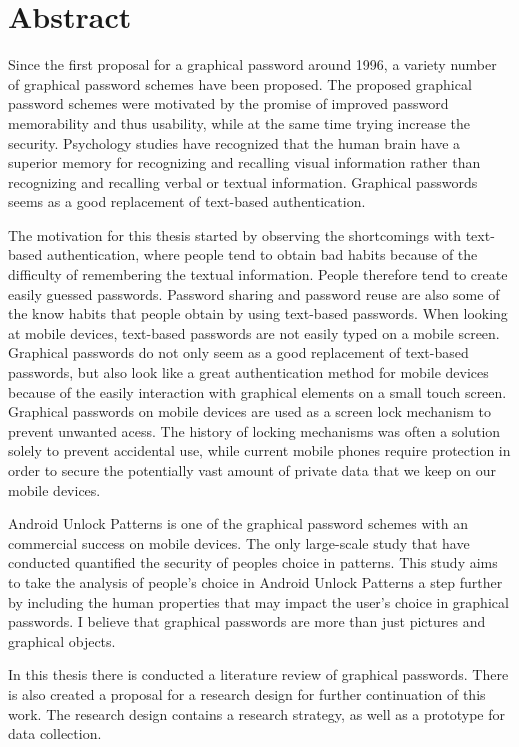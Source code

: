 \section*{Abstract}
  
  Since the first proposal for a graphical password around 1996, a variety number of graphical password schemes have been proposed. The proposed graphical password schemes were motivated by the promise of improved password memorability and thus usability, while at the same time trying increase the security.  Psychology studies have recognized that the human brain have a superior memory for recognizing and recalling visual information rather than recognizing and recalling verbal or textual information. Graphical passwords seems as a good replacement of text-based authentication. 

  The motivation for this thesis started by observing the shortcomings with text-based authentication, where people tend to obtain bad habits because of the difficulty of remembering the textual information. People therefore tend to create easily guessed passwords. Password sharing and password reuse are also some of the know habits that people obtain by using text-based passwords. When looking at mobile devices, text-based passwords are not easily typed on a mobile screen. Graphical passwords do not only seem as a good replacement of text-based passwords, but also look like a great authentication method for mobile devices because of the easily interaction with graphical elements on a small touch screen. Graphical passwords on mobile devices are used as a screen lock mechanism to prevent unwanted acess. The history of locking mechanisms was often a solution solely to prevent accidental use, while current mobile phones require protection in order to secure the potentially vast amount of private data that we keep on our mobile devices.

  Android Unlock Patterns is one of the graphical password schemes with an commercial success on mobile devices. The only large-scale study that have conducted quantified the security of peoples choice in patterns. This study aims to take the analysis of people's choice in Android Unlock Patterns a step further by including the human properties that may impact the user's choice in graphical passwords. I believe that graphical passwords are more than just pictures and graphical objects.

  In this thesis there is conducted a literature review of graphical passwords. There is also created a proposal for a research design for further continuation of this work. The research design contains a research strategy, as well as a prototype for data collection. 

  